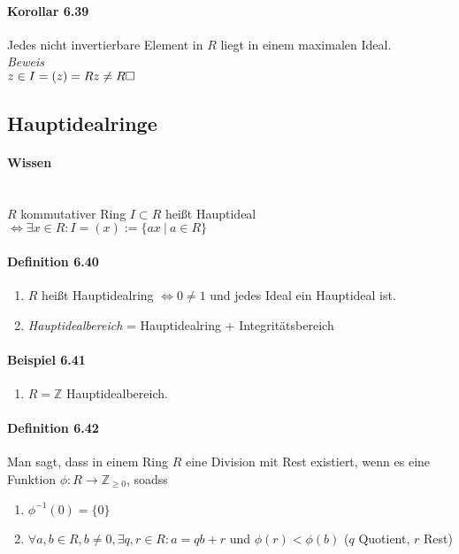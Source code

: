 \documentclass{scrartcl}
\begin{document}
\paragraph{Korollar 6.39}
Jedes nicht invertierbare Element in $R$ liegt in einem maximalen Ideal. \\
\textit{Beweis} \\
$z \in I = (z) = Rz \neq R \hfill \square$

\subsection*{Hauptidealringe}
\label{subsec:hauptidealbereiche}

\paragraph{Wissen} ~\\
$R$ kommutativer Ring $I \subset R$ heißt Hauptideal $\Leftrightarrow \exists x
\in R: I = (x) := \{ax ~|~ a \in R\}$

\paragraph{Definition 6.40}
\begin{enumerate}
\item $R$ heißt Hauptidealring $\Leftrightarrow 0 \neq 1$ und jedes Ideal ein
  Hauptideal ist.
\item \textit{Hauptidealbereich} = Hauptidealring + Integritätsbereich
\end{enumerate}

\paragraph{Beispiel 6.41}
\begin{enumerate}
\item $R = \mathbb{Z}$ Hauptidealbereich.
\end{enumerate}

\paragraph{Definition 6.42}
Man sagt, dass in einem Ring $R$ eine Division mit Rest existiert, wenn es eine
Funktion $\phi: R \to \mathbb{Z}_{\geq 0}$, soadss
\begin{enumerate}
\item $\phi^{-1}(0) = \{0\}$
\item $\forall a,b \in R, b \neq 0, \exists q,r \in R: a = qb + r$
  und $\phi(r) < \phi(b)$ ($q$ Quotient, $r$ Rest)
\end{enumerate}
\end{document}
